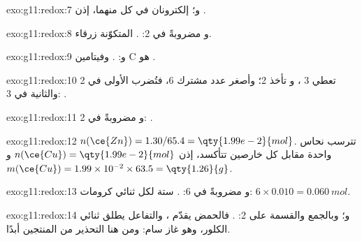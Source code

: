 \begin{solution}{exo:g11:redox:7}
 و؛ إلكترونان
في كل منهما، إذن .
\end{solution}

\begin{solution}{exo:g11:redox:8}
 و مضروبةً في 2:
.   المتكوّنة زرقاء.
\end{solution}

\begin{solution}{exo:g11:redox:9}
 و:
. وفيتامين C هو .
\end{solution}

\begin{solution}{exo:g11:redox:10}
 تعطي 3 ، و
تأخذ 2؛ وأصغر عدد مشترك 6، فتُضرب الأولى في
2 والثانية في 3: .
\end{solution}

\begin{solution}{exo:g11:redox:11}
 و مضروبةً في 2:
.
\end{solution}

\begin{solution}{exo:g11:redox:12}
$n(\ce{Zn}) = 1.30/65.4 = \qty{1.99e-2}{mol}$. تترسب  نحاس واحدة
مقابل كل  خارصين تتأكسد، إذن $n(\ce{Cu}) = \qty{1.99e-2}{mol}$
و$m(\ce{Cu}) = 1.99\times 10^{-2} \times 63.5 = \qty{1.26}{g}$.
\end{solution}

\begin{solution}{exo:g11:redox:13}
و مضروبةً في 6:
.
ستة   لكل  ثنائي كرومات: $6 \times 0.010 = \qty{0.060}{mol}$.
\end{solution}

\begin{solution}{exo:g11:redox:14}
 و؛ وبالجمع
والقسمة على 2: . فالحمض يقدّم
 ، والتفاعل يطلق ثنائي الكلور، وهو غاز سام:
ومن هنا التحذير من  المنتجين أبدًا.
\end{solution}

